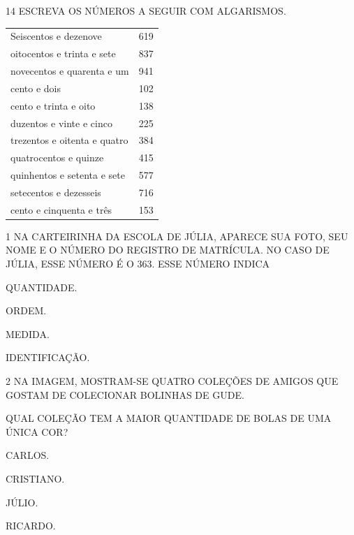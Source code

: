 

\num{14} ESCREVA OS NÚMEROS A SEGUIR COM ALGARISMOS.

\begin{longtable}[]{@{}ll@{}}
\toprule
Seiscentos e dezenove & 619\tabularnewline
oitocentos e trinta e sete & 837\tabularnewline
novecentos e quarenta e um & 941\tabularnewline
cento e dois & 102\tabularnewline
cento e trinta e oito & 138\tabularnewline
duzentos e vinte e cinco & 225\tabularnewline
trezentos e oitenta e quatro & 384\tabularnewline
quatrocentos e quinze & 415\tabularnewline
quinhentos e setenta e sete & 577\tabularnewline
setecentos e dezesseis & 716\tabularnewline
cento e cinquenta e três & 153\tabularnewline
\bottomrule
\end{longtable}


\num{1} NA CARTEIRINHA DA ESCOLA DE JÚLIA, APARECE SUA FOTO, SEU NOME E O NÚMERO DO
REGISTRO DE MATRÍCULA. NO CASO DE JÚLIA, ESSE NÚMERO É O 363. ESSE NÚMERO INDICA

\begin{escolha}
\item
  QUANTIDADE.
\item
  ORDEM.
\item
  MEDIDA.
\item
  IDENTIFICAÇÃO.
\end{escolha}



\num{2} NA IMAGEM, MOSTRAM-SE QUATRO COLEÇÕES DE AMIGOS QUE GOSTAM DE COLECIONAR
BOLINHAS DE GUDE.



QUAL COLEÇÃO TEM A MAIOR QUANTIDADE DE BOLAS DE UMA ÚNICA COR?

\begin{escolha}
\item
  CARLOS.
\item
  CRISTIANO.
\item
  JÚLIO.
\item
  RICARDO.
\end{escolha}

